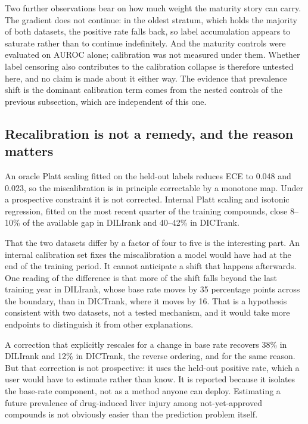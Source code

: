 Two further observations bear on how much weight the maturity story can carry. The
gradient does not continue: in the oldest stratum, which holds the majority of both
datasets, the positive rate falls back, so label accumulation appears to saturate
rather than to continue indefinitely. And the maturity controls were evaluated on
AUROC alone; calibration was not measured under them. Whether label censoring also
contributes to the calibration collapse is therefore untested here, and no claim is
made about it either way. The evidence that prevalence shift is the dominant
calibration term comes from the nested controls of the previous subsection, which
are independent of this one.

\subsection{Recalibration is not a remedy, and the reason matters}

An oracle Platt scaling fitted on the held-out labels reduces ECE to 0.048 and
0.023, so the miscalibration is in principle correctable by a monotone map. Under
a prospective constraint it is not corrected. Internal Platt scaling and isotonic
regression, fitted on the most recent quarter of the training compounds, close
8--10\% of the available gap in DILIrank and 40--42\% in DICTrank.

That the two datasets differ by a factor of four to five is the interesting part.
An internal calibration set fixes the miscalibration a model would have had at the
end of the training period. It cannot anticipate a shift that happens afterwards.
One reading of the difference is that more of the shift falls beyond the last
training year in DILIrank, whose base rate moves by 35 percentage points across the
boundary, than in DICTrank, where it moves by 16. That is a hypothesis consistent
with two datasets, not a tested mechanism, and it would take more endpoints to
distinguish it from other explanations.

A correction that explicitly rescales for a change in base rate recovers 38\% in
DILIrank and 12\% in DICTrank, the reverse ordering, and for the same reason. But
that correction is not prospective: it uses the held-out positive rate, which a
user would have to estimate rather than know. It is reported because it isolates
the base-rate component, not as a method anyone can deploy. Estimating a future
prevalence of drug-induced liver injury among not-yet-approved compounds is not
obviously easier than the prediction problem itself.

